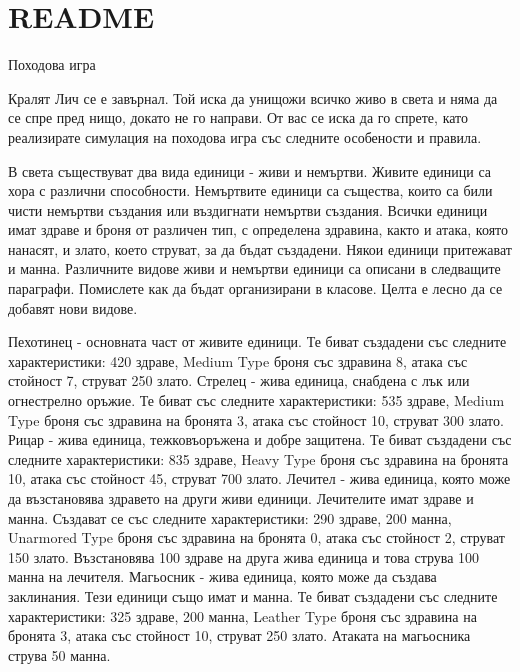 \chapter{README}
\hypertarget{md_CLionProjects_2Turn-basedGame_2README}{}\label{md_CLionProjects_2Turn-basedGame_2README}
Походова игра

Кралят Лич се е завърнал. Той иска да унищожи всичко живо в света и няма да се спре пред нищо, докато не го направи. От вас се иска да го спрете, като реализирате симулация на походова игра със следните особености и правила.

В света съществуват два вида единици -\/ живи и немъртви. Живите единици са хора с различни способности. Немъртвите единици са същества, които са били чисти немъртви създания или въздигнати немъртви създания. Всички единици имат здраве и броня от различен тип, с определена здравина, както и атака, която нанасят, и злато, което струват, за да бъдат създадени. Някои единици притежават и манна. Различните видове живи и немъртви единици са описани в следващите параграфи. Помислете как да бъдат организирани в класове. Целта е лесно да се добавят нови видове.

Пехотинец -\/ основната част от живите единици. Те биват създадени със следните характеристики\+: 420 здраве, Medium Type броня със здравина 8, атака със стойност 7, струват 250 злато. Стрелец -\/ жива единица, снабдена с лък или огнестрелно оръжие. Те биват със следните характеристики\+: 535 здраве, Medium Type броня със здравина на бронята 3, атака със стойност 10, струват 300 злато. Рицар -\/ жива единица, тежковъоръжена и добре защитена. Те биват създадени със следните характеристики\+: 835 здраве, Heavy Type броня със здравина на бронята 10, атака със стойност 45, струват 700 злато. Лечител -\/ жива единица, която може да възстановява здравето на други живи единици. Лечителите имат здраве и манна. Създават се със следните характеристики\+: 290 здраве, 200 манна, Unarmored Type броня със здравина на бронята 0, атака със стойност 2, струват 150 злато. Възстановява 100 здраве на друга жива единица и това струва 100 манна на лечителя. Магьосник -\/ жива единица, която може да създава заклинания. Тези единици също имат и манна. Те биват създадени със следните характеристики\+: 325 здраве, 200 манна, Leather Type броня със здравина на бронята 3, атака със стойност 10, струват 250 злато. Атаката на магьосника струва 50 манна.

